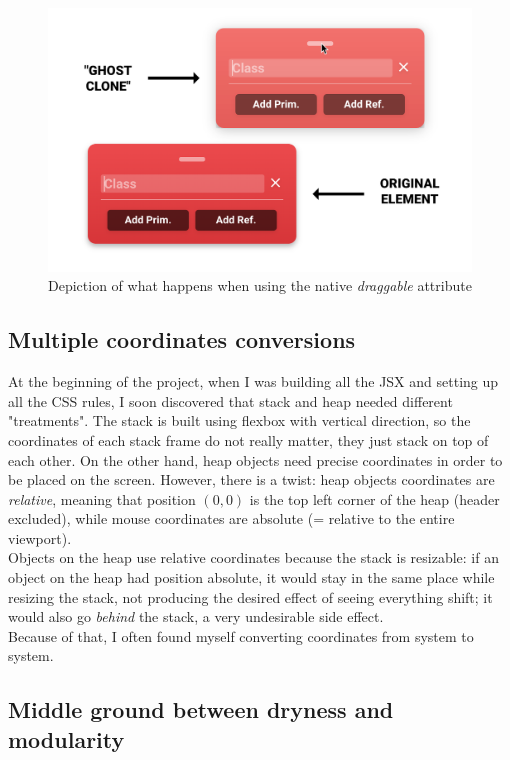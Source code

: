 \documentclass[]{usiinfbachelorproject}
\begin{document}
\begin{figure}[h!]
\centering
\includegraphics[scale=.5]{figures/ghost-clone.png}
\caption {Depiction of what happens when using the native \emph{draggable} attribute}
\end{figure}
 
\subsection{Multiple coordinates conversions}

At the beginning of the project, when I was building all the JSX and setting up all the CSS rules, I soon discovered that stack and heap needed different "treatments". The stack is built using flexbox with vertical direction, so the coordinates of each stack frame do not really matter, they just stack on top of each other. On the other hand, heap objects need precise coordinates in order to be placed on the screen. However, there is a twist: heap objects coordinates are \emph{relative}, meaning that position ${(0,0)}$ is the top left corner of the heap (header excluded), while mouse coordinates are absolute (= relative to the entire viewport).\\
Objects on the heap use relative coordinates because the stack is resizable: if an object on the heap had position absolute, it would stay in the same place while resizing the stack, not producing the desired effect of seeing everything shift; it would also go \emph{behind} the stack, a very undesirable side effect.\\
Because of that, I often found myself converting coordinates from system to system.

\subsection{Middle ground between dryness and modularity}
\end{document}
